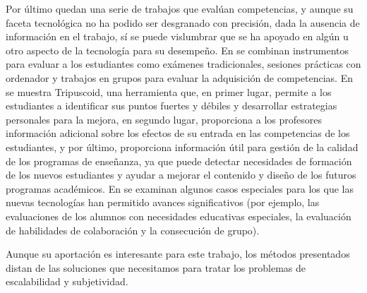 Por último quedan una serie de trabajos que evalúan competencias, y aunque su faceta tecnológica no ha podido ser desgranado con precisión, dada la ausencia de información en el trabajo, sí se puede vislumbrar que se ha apoyado en algún u otro aspecto de la tecnología para su desempeño. En \cite{Velasco:2012} se combinan instrumentos para evaluar a los estudiantes como exámenes tradicionales, sesiones prácticas con ordenador y trabajos en grupos para evaluar la adquisición de competencias. En \cite{Achcaoucaou:2012} se muestra Tripuscoid, una herramienta que, en primer lugar, permite a los estudiantes a identificar sus puntos fuertes y débiles y desarrollar estrategias personales para la mejora, en segundo lugar, proporciona a los profesores información adicional sobre los efectos de su entrada en las competencias de los estudiantes, y por último, proporciona información útil para gestión de la calidad de los programas de enseñanza, ya que puede detectar necesidades de formación de los nuevos estudiantes y ayudar a mejorar el contenido y diseño de los futuros programas académicos. En \cite{BenoCsap:2012} se examinan algunos casos especiales para los que las nuevas tecnologías han permitido avances significativos (por ejemplo, las evaluaciones de los alumnos con necesidades educativas especiales, la evaluación de habilidades de colaboración y la consecución de grupo). 

Aunque su aportación es interesante para este trabajo, los métodos presentados distan de las soluciones que necesitamos para tratar los problemas de escalabilidad y subjetividad.

